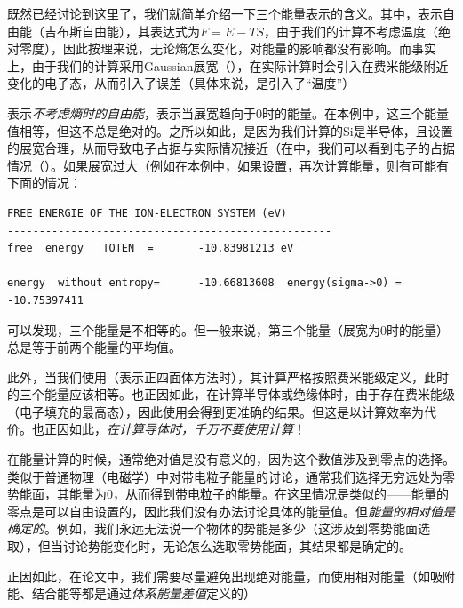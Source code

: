 \begin{extend}
    既然已经讨论到这里了，我们就简单介绍一下三个能量表示的含义。其中，表示自由能（吉布斯自由能），其表达式为$F=E-TS$，由于我们的计算不考虑温度（绝对零度），因此按理来说，无论熵怎么变化，对能量的影响都没有影响。而事实上，由于我们的计算采用Gaussian展宽（），在实际计算时会引入在费米能级附近变化的电子态，从而引入了误差（具体来说，是引入了“温度”）

    表示\emph{不考虑熵时的自由能}，表示当展宽趋向于0时的能量。在本例中，这三个能量值相等，但这不总是绝对的。之所以如此，是因为我们计算的Si是半导体，且设置的展宽合理，从而导致电子占据与实际情况接近（在中，我们可以看到电子的占据情况（）。如果展宽过大（例如在本例中，如果设置，再次计算能量，则有可能有下面的情况：

    \begin{lstlisting}[caption=OUTCAR]
FREE ENERGIE OF THE ION-ELECTRON SYSTEM (eV)
---------------------------------------------------
free  energy   TOTEN  =       -10.83981213 eV

energy  without entropy=      -10.66813608  energy(sigma->0) =      -10.75397411        
    \end{lstlisting}

    可以发现，三个能量是不相等的。但一般来说，第三个能量（展宽为0时的能量）总是等于前两个能量的平均值。

    此外，当我们使用（表示正四面体方法时），其计算严格按照费米能级定义，此时的三个能量应该相等。也正因如此，在计算半导体或绝缘体时，由于存在费米能级（电子填充的最高态），因此使用会得到更准确的结果。但这是以计算效率为代价。也正因如此，\emph{在计算导体时，千万不要使用计算}！
\end{extend}

\begin{attention}
    在能量计算的时候，通常绝对值是没有意义的，因为这个数值涉及到零点的选择。类似于普通物理（电磁学）中对带电粒子能量的讨论，通常我们选择无穷远处为零势能面，其能量为0，从而得到带电粒子的能量。在这里情况是类似的——能量的零点是可以自由设置的，因此我们没有办法讨论具体的能量值。但\emph{能量的相对值是确定的}。例如，我们永远无法说一个物体的势能是多少（这涉及到零势能面选取），但当讨论势能变化时，无论怎么选取零势能面，其结果都是确定的。

    正因如此，在论文中，我们需要尽量避免出现绝对能量，而使用相对能量（如吸附能、结合能等都是通过\emph{体系能量差值}定义的）
\end{attention}

